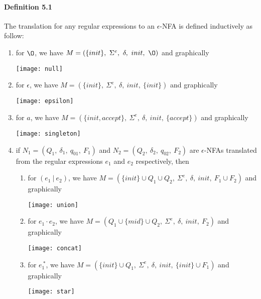 \paragraph{Definition 5.1} The translation for any regular expressions
to an \(\epsilon\)-NFA is defined inductively as follow:
\begin{enumerate}[nolistsep]
  \item for \(\O\), we have \(M = (\{init\},\ \Sigma^e,\ \delta,\
    init,\ \O)\) and graphically \begin{center}\texttt{[image: null]}\end{center}
  \item for \(\epsilon\), we have \(M = (\{init\},\ \Sigma^e,\
    \delta,\ init,\ \{init\})\) and graphically \begin{center}\texttt{[image: epsilon]}\end{center}
  \item for \(a\), we have \(M = (\{init, accept\},\ \Sigma^e,\
    \delta,\ init,\ \{accept\})\) and graphically \begin{center}\texttt{[image: singleton]}\end{center}
  \item if \(N_1 = (Q_1,\ \delta_1,\ q_{01},\ F_1)\) and \(N_2 =
    (Q_2,\ \delta_2,\ q_{02},\ F_2)\) are \(\epsilon\)-NFAs translated from the
    regular expressions \(e_1\) and \(e_2\) respectively, then
    \begin{enumerate}[nolistsep]
      \item for \((e_1\ |\ e_2)\), we have \(M = (\{init\} \cup Q_1
        \cup Q_2,\ \Sigma^e,\ \delta,\ init,\ F_1 \cup F_2)\) and
        graphically \begin{center}\texttt{[image: union]}\end{center}
      \item for \(e_1\cdot e_2\), we have \(M = (Q_1 \cup \{mid\}
        \cup Q_2,\ \Sigma^e,\ \delta,\ init,\ F_2)\) and graphically \begin{center}\texttt{[image: concat]}\end{center}
      \item for \(e_1^{\ *}\), we have \(M = (\{init\} \cup Q_1,\
        \Sigma^e,\ \delta,\ init,\ \{init\} \cup F_1)\) and
        graphically \begin{center}\texttt{[image: star]}\end{center}
     \end{enumerate}
\end{enumerate}


